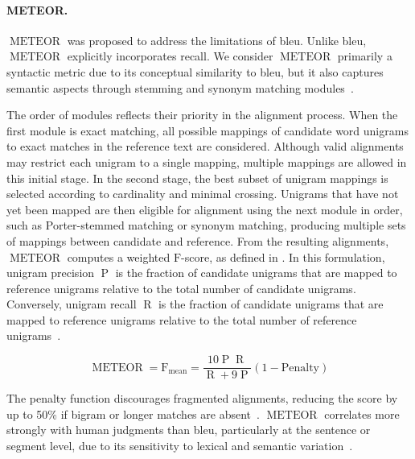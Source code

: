 
\paragraph{METEOR.}
$\operatorname{METEOR}$ was proposed to address the limitations of \ac{bleu}. 
Unlike \ac{bleu}, $\operatorname{METEOR}$ explicitly incorporates recall. 
We consider $\operatorname{METEOR}$ primarily a syntactic metric due to its conceptual similarity to \ac{bleu}, but it also captures semantic aspects through stemming and synonym matching modules~\citep{kurt_pehlivanoglu_comparative_2024}. 

The order of modules reflects their priority in the alignment process. 
When the first module is exact matching, all possible mappings of candidate word unigrams to exact matches in the reference text are considered. 
Although valid alignments may restrict each unigram to a single mapping, multiple mappings are allowed in this initial stage. 
In the second stage, the best subset of unigram mappings is selected according to cardinality and minimal crossing. 
Unigrams that have not yet been mapped are then eligible for alignment using the next module in order, such as Porter-stemmed matching or synonym matching, producing multiple sets of mappings between candidate and reference. 
From the resulting alignments, $\operatorname{METEOR}$ computes a weighted $\mathrm{F}$-score, as defined in . 
In this formulation, unigram precision $\operatorname{P}$ is the fraction of candidate unigrams that are mapped to reference unigrams relative to the total number of candidate unigrams. 
Conversely, unigram recall $\operatorname{R}$ is the fraction of candidate unigrams that are mapped to reference unigrams relative to the total number of reference unigrams~\citep{banerjee_METEOR_2005}.

\begin{equation}
    \operatorname{METEOR} = \operatorname{F_{mean}} = \frac{10  \operatorname{P}  \operatorname{R}}{\operatorname{R} + 9  \operatorname{P}}  (1 - \mathrm{Penalty})
\label{eq:meteor}
\end{equation}

The penalty function discourages fragmented alignments, reducing the score by up to 50\% if bigram or longer matches are absent~\citep{banerjee_METEOR_2005}. 
$\operatorname{METEOR}$ correlates more strongly with human judgments than \ac{bleu}, particularly at the sentence or segment level, due to its sensitivity to lexical and semantic variation~\citep{zhou_paraphrase_2021,kurt_pehlivanoglu_comparative_2024}.


